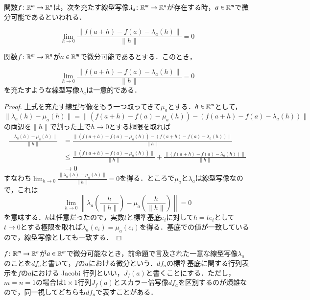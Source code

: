 \begin{defi}
関数$f\colon \mathbb{R}^m \to \mathbb{R}^n$は，次を充たす線型写像$\lambda_a \colon \mathbb{R}^m \to \mathbb{R}^n$が存在する時，$a \in \mathbb{R}^m$で微分可能であるといわれる．

\begin{equation}
\lim_{h \to 0} \frac{\|f(a+h) - f(a) - \lambda_a(h) \|}{\|h\|}=0
\end{equation}
\end{defi}

\begin{prop}
関数$f\colon \mathbb{R}^m \to \mathbb{R}^n$が$a \in \mathbb{R}^m$で微分可能であるとする．このとき，

\begin{equation}
\lim_{h \to 0} \frac{\|f(a+h) - f(a) - \lambda_a(h) \|}{\|h\|}=0
\end{equation}を充たすような線型写像$\lambda_a$は一意的である．
\end{prop}

\begin{proof}
上式を充たす線型写像をもう一つ取ってきて$\mu_a$とする．$h \in \mathbb{R}^m$として，
\begin{equation}
\|\lambda_a(h) - \mu_a(h)\| = \| (f(a+h) - f(a) - \mu_a(h) ) - (f(a+h) - f(a) - \lambda_a(h)) \|
\end{equation}の両辺を$\|h\|$で割った上で$h \to 0$とする極限を取れば
\begin{align}
\frac{\|\lambda_a(h) - \mu_a(h)\|}{\|h\|} &= \frac{\| (f(a+h) - f(a) - \mu_a(h) ) - (f(a+h) - f(a) - \lambda_a(h)) \|}{\|h\|}\\
& \leq \frac{\| (f(a+h) - f(a) - \mu_a(h) )\|}{\|h\|} + \frac{\|(f(a+h) - f(a) - \lambda_a(h)) \|}{\|h\|}\\
& \to 0
\end{align}すなわち$\lim_{h \to 0}\frac{\|\lambda_a(h) - \mu_a(h)\|}{\|h\|} =0$を得る．ところで$\mu_a$と$\lambda_a$は線型写像なので，これは
\begin{equation}
\lim_{h \to 0} \left\|\lambda_a\left(\frac{h}{\|h\|}\right) - \mu_a\left(\frac{h}{\|h\|}\right)\right\| =0
\end{equation}を意味する．$h$は任意だったので，実数$t$と標準基底$e_i$に対して$h = te_i$として$t\to 0$とする極限を取れば$\lambda_a(e_i) = \mu_a(e_i)$を得る．基底での値が一致しているので，線型写像としても一致する．
\end{proof}

\begin{defi}
$f \colon \mathbb{R}^m \to \mathbb{R}^n$が$a \in \mathbb{R}^m$で微分可能なとき，前命題で言及された一意な線型写像$\lambda_a$のことを$df_a$と書いて，$f$の$a$における微分という．$df_a$の標準基底に関する行列表示を$f$の$a$における Jacobi 行列といい，$J_f(a)$と書くことにする．ただし，$m=n=1$の場合は$1 \times 1$行列$J_f(a)$とスカラー倍写像$df_a$を区別するのが煩雑なので，同一視してどちらも$df_a$で表すことがある．
\end{defi}

